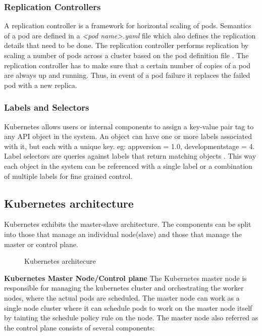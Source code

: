 \documentclass[9pt,twocolumn,twoside]{../../styles/osajnl}
\begin{document}
\subsubsection{Replication Controllers}
A replication controller is a framework for horizontal scaling of
pods. Semantics of a pod are defined in a \emph{<pod\textunderscore
name>.yaml} file which also defines the replication details that need
to be done. The replication controller performs replication by scaling
a number of pods across a cluster based on the pod definition file
\cite{www-wiki-kubernetes}. The replication controller has to make
sure that a certain number of copies of a pod are always up and
running. Thus, in event of a pod failure it replaces the failed pod
with a new replica.

\subsubsection{Labels and Selectors}
Kubernetes allows users or internal components to assign a key-value
pair tag to any API object in the system. An object can have one or
more labels associated with it, but each with a unique key. eg:
appversion = 1.0, development\textunderscore stage = 4. Label
selectors are queries against labels that return matching objects
\cite{www-kubernetes-digitalocean}. This way each object in the system
can be referenced with a single label or a combination of multiple
labels for fine grained control.

\subsection{Kubernetes architecture}
Kubernetes exhibits the master-slave architecture. The components can
be split into those that manage an individual node(slave) and those
that manage the master or control plane.

\begin{figure}[htbp]
\centering
{}
\caption{Kubernetes architecure \cite{www-kubernetes-architecture}}
\label{fig:Kubernetes Minimum Architecture}
\end{figure}

\noindent
\textbf{Kubernetes Master Node/Control plane}
\newline
The Kubernetes master node is responsible for managing the kubernetes
cluster and orchestrating the worker nodes, where the actual pods are
scheduled. The master node can work as a single node cluster where it
can schedule pods to work on the master node itself by tainting the
schedule policy rule on the node. The master node also referred as
the control plane consists of several components:
\end{document}
